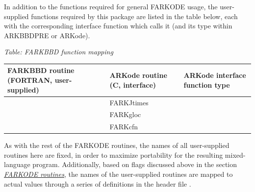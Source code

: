 \documentclass[letterpaper,10pt,english]{sphinxmanual}
\begin{document}
In addition to the functions required for general FARKODE usage, the
user-supplied functions required by this package are listed in the
table below, each with the corresponding interface function which
calls it (and its type within ARKBBDPRE or ARKode).

\emph{Table: FARKBBD function mapping}

\begin{tabulary}{\linewidth}{|L|L|L|}
\hline
\textbf{\relax 
FARKBBD routine
(FORTRAN, user-supplied)
} & \textbf{\relax 
ARKode routine
(C, interface)
} & \textbf{\relax 
ARKode interface
function type
}\\\hline

{\hyperref[f_interface/Usage:f/_/FARKJTIMES]{}}
 & 
FARKJtimes
 & 
{\hyperref[c_interface/User_supplied:ARKSpilsJacTimesVecFn]{}}
\\\hline

{\hyperref[f_interface/Preconditioning:f/_/FARKGLOCFN]{}}
 & 
FARKgloc
 & 
{\hyperref[c_interface/Preconditioners:ARKLocalFn]{}}
\\\hline

{\hyperref[f_interface/Preconditioning:f/_/FARKCOMMFN]{}}
 & 
FARKcfn
 & 
{\hyperref[c_interface/Preconditioners:ARKCommFn]{}}
\\\hline
\end{tabulary}


As with the rest of the FARKODE routines, the names of all
user-supplied routines here are fixed, in order to maximize
portability for the resulting mixed-language program.  Additionally,
based on flags discussed above in the section {\hyperref[f_interface/Routines:finterface-routines]{\emph{FARKODE routines}}},
the names of the user-supplied routines are mapped to actual values
through a series of definitions in the header file .
\end{document}
